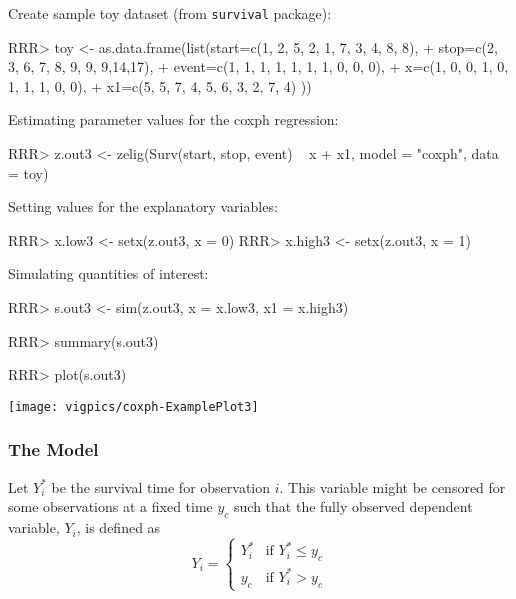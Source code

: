 \begin{enumerate}
Create sample toy dataset (from {\tt survival} package):
\begin{Schunk}
\begin{Sinput}
RRR> toy <- as.data.frame(list(start=c(1, 2, 5, 2, 1, 7, 3, 4, 8, 8),
+             stop=c(2, 3, 6, 7, 8, 9, 9, 9,14,17),
+             event=c(1, 1, 1, 1, 1, 1, 1, 0, 0, 0),
+             x=c(1, 0, 0, 1, 0, 1, 1, 1, 0, 0),
+ 	    x1=c(5, 5, 7, 4, 5, 6, 3, 2, 7, 4) ))
\end{Sinput}
\end{Schunk}
Estimating parameter values for the coxph regression:
\begin{Schunk}
\begin{Sinput}
RRR> z.out3 <- zelig(Surv(start, stop, event) ~ x + x1, model = "coxph", data = toy)
\end{Sinput}
\end{Schunk}
Setting values for the explanatory variables:
\begin{Schunk}
\begin{Sinput}
RRR> x.low3 <- setx(z.out3, x = 0)
RRR> x.high3 <- setx(z.out3, x = 1)
\end{Sinput}
\end{Schunk}
Simulating quantities of interest:
\begin{Schunk}
\begin{Sinput}
RRR> s.out3 <- sim(z.out3, x = x.low3, x1 = x.high3)
\end{Sinput}
\end{Schunk}
\begin{Schunk}
\begin{Sinput}
RRR> summary(s.out3)
\end{Sinput}
\end{Schunk}
\begin{center}
\begin{Schunk}
\begin{Sinput}
RRR> plot(s.out3)
\end{Sinput}
\end{Schunk}
\texttt{[image: vigpics/coxph-ExamplePlot3]}
\end{center}

\end{enumerate}

\subsubsection{The Model}
Let $Y_i^*$ be the survival time for observation $i$. This variable
might be censored for some observations at a fixed time $y_c$ such
that the fully observed dependent variable, $Y_i$, is defined as
\begin{equation*}
  Y_i = \left\{ \begin{array}{ll}
      Y_i^* & \textrm{if }Y_i^* \leq y_c \\
      y_c & \textrm{if }Y_i^* > y_c
    \end{array} \right.
\end{equation*}

